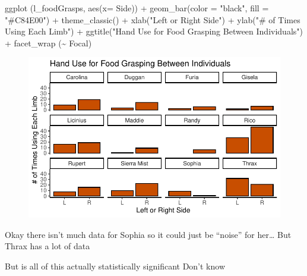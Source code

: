 \documentclass[
  letterpaper,
  DIV=11,
  numbers=noendperiod]{scrartcl}
\newenvironment{Shaded}{\begin{snugshade}}{\end{snugshade}}
\newcommand{\AttributeTok}[1]{\textcolor[rgb]{0.40,0.45,0.13}{#1}}
\newcommand{\FunctionTok}[1]{\textcolor[rgb]{0.28,0.35,0.67}{#1}}
\newcommand{\NormalTok}[1]{\textcolor[rgb]{0.00,0.23,0.31}{#1}}
\newcommand{\SpecialCharTok}[1]{\textcolor[rgb]{0.37,0.37,0.37}{#1}}
\newcommand{\StringTok}[1]{\textcolor[rgb]{0.13,0.47,0.30}{#1}}
\begin{document}
\begin{Shaded}
\begin{Highlighting}[]
\FunctionTok{ggplot}\NormalTok{ (l\_foodGrasps, }\FunctionTok{aes}\NormalTok{(}\AttributeTok{x=}\NormalTok{ Side)) }\SpecialCharTok{+}
  \FunctionTok{geom\_bar}\NormalTok{(}\AttributeTok{color =} \StringTok{"black"}\NormalTok{, }\AttributeTok{fill =} \StringTok{"\#C84E00"}\NormalTok{) }\SpecialCharTok{+}
  \FunctionTok{theme\_classic}\NormalTok{() }\SpecialCharTok{+}
  \FunctionTok{xlab}\NormalTok{(}\StringTok{"Left or Right Side"}\NormalTok{) }\SpecialCharTok{+}
  \FunctionTok{ylab}\NormalTok{(}\StringTok{"\# of Times Using Each Limb"}\NormalTok{) }\SpecialCharTok{+}
  \FunctionTok{ggtitle}\NormalTok{(}\StringTok{"Hand Use for Food Grasping Between Individuals"}\NormalTok{) }\SpecialCharTok{+}
  \FunctionTok{facet\_wrap}\NormalTok{ (}\SpecialCharTok{\textasciitilde{}}\NormalTok{ Focal)}
\end{Highlighting}
\end{Shaded}

\begin{figure}[H]

{\centering \includegraphics{LeftyLemurs_files/figure-pdf/unnamed-chunk-33-1.pdf}

}

\end{figure}

Okay there isn't much data for Sophia so it could just be ``noise'' for
her\ldots{} But Thrax has a lot of data

But is all of this actually statistically significant Don't know
\end{document}
